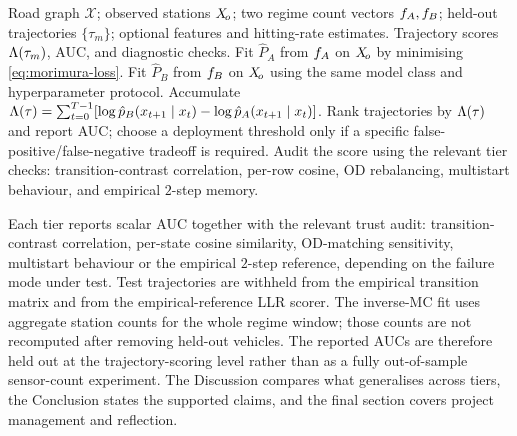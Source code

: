 \begin{algorithm}[H]
\caption{Partial-observation routing-influence filter used in the three tiers}
\label{alg:routing-filter}
\begin{algorithmic}[1]
\Require Road graph $\mathcal{X}$; observed stations $X_{\!o}$; two regime
count vectors $f_A,f_B$; held-out trajectories
$\{\tau_m\}$; optional features and hitting-rate estimates.
\Ensure Trajectory scores $\Lambda(\tau_m)$, AUC, and diagnostic checks.
\State Fit $\hat{P}_A$ from $f_A$ on $X_{\!o}$ by minimising
\cref{eq:morimura-loss}.
\State Fit $\hat{P}_B$ from $f_B$ on $X_{\!o}$ using the same model class
and hyperparameter protocol.
  \State Accumulate
  $\Lambda(\tau)=\sum_{t=0}^{T-1}[\log\hat{p}_B(x_{t+1}\mid x_t)
  -\log\hat{p}_A(x_{t+1}\mid x_t)]$.
\EndFor
\State Rank trajectories by $\Lambda(\tau)$ and report AUC; choose a
deployment threshold only if a specific false-positive/false-negative
tradeoff is required.
\State Audit the score using the relevant tier checks: transition-contrast
correlation, per-row cosine, OD rebalancing, multistart behaviour, and
empirical $2$-step memory.
\end{algorithmic}
\end{algorithm}

Each tier reports scalar AUC together with the relevant trust audit:
transition-contrast correlation, per-state cosine similarity,
OD-matching sensitivity, multistart behaviour or the empirical $2$-step
reference, depending on the failure mode under test. Test trajectories are
withheld from the empirical transition matrix and from the
empirical-reference LLR scorer. The inverse-MC fit uses aggregate station
counts for the whole regime window; those counts are not recomputed after
removing held-out vehicles. The reported AUCs are therefore held out at the
trajectory-scoring level rather than as a fully out-of-sample sensor-count
experiment. The Discussion compares what generalises across tiers, the
Conclusion states the supported claims, and the final section covers
project management and reflection.
